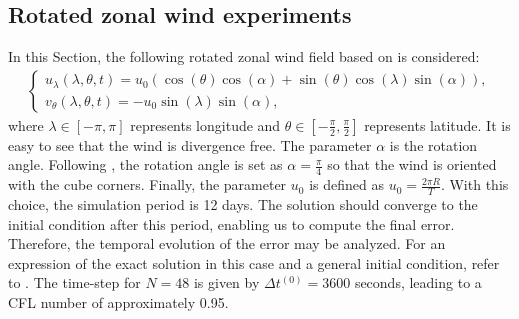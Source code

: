 \documentclass[preprint,12pt]{elsarticle}
\begin{document}
\begin{linenumbers}
\subsection{Rotated zonal wind experiments}
In this Section, the following rotated zonal wind field based on \cite{will:1992} is considered:
\begin{align}
	\label{zonal-wind}
	\begin{cases}
		u_\lambda(\lambda,\theta,t) = u_0(\cos(\theta)\cos(\alpha) + \sin(\theta)\cos(\lambda)\sin(\alpha)),\\
		v_\theta(\lambda,\theta,t) = -u_0\sin(\lambda)\sin(\alpha),
	\end{cases}
\end{align}
where $\lambda \in [-\pi,\pi]$ represents longitude and $\theta \in [-\frac{\pi}{2},\frac{\pi}{2}]$ represents latitude. 
It is easy to see that the wind is divergence free.
The parameter $\alpha$ is the rotation angle. Following \cite{putman:2007}, the rotation angle is set as $\alpha=\frac{\pi}{4}$ so that the wind is oriented with the cube corners. 
Finally, the parameter $u_0$ is defined as $u_0 = \frac{2\pi R}{T}$.
With this choice, the simulation period is 12 days. The solution should converge to the initial condition after this period, enabling us to compute the final error.
Therefore, the temporal evolution of the error may be analyzed.
For an expression of the exact solution in this case and a general initial condition, refer to \cite[Theorem 5.1, p. 155]{brachet:2018}.
The time-step for $N=48$ is given by $\Delta t^{(0)} = 3600$ seconds, leading to a CFL number of approximately 0.95. 


\end{linenumbers}
\end{document}
